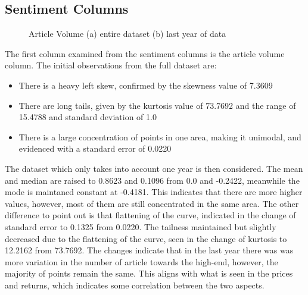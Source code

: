 \subsection{Sentiment Columns}

\begin{figure}[h!]
    \centering
    \caption{Article Volume (a) entire dataset (b) last year of data}
    \label{fig:articleDesc}
\end{figure}

The first column examined from the sentiment columns is the article volume column. The initial observations from the full dataset are:
\begin{itemize}
    \item There is a heavy left skew, confirmed by the skewness value of 7.3609
    \item There are long tails, given by the kurtosis value of 73.7692 and the range of 15.4788 and standard deviation of 1.0
    \item There is a large concentration of points in one area, making it unimodal, and evidenced with a standard error of 0.0220
\end{itemize}
The dataset which only takes into account one year is then considered. The mean and median are raised to 0.8623 and 0.1096 from 0.0 and -0.2422, meanwhile the mode is maintaned constant at -0.4181. This indicates that there are more higher values, however, most of them are still concentrated in the same area. The other difference to point out is that flattening of the curve, indicated in the change of standard error to 0.1325 from 0.0220. The tailness maintained but slightly decreased due to the flattening of the curve, seen in the change of kurtosis to 12.2162 from 73.7692. The changes indicate that in the last year there was was more variation in the number of article towards the high-end, however, the majority of points remain the same. This aligns with what is seen in the prices and returns, which indicates some correlation between the two aspects.

